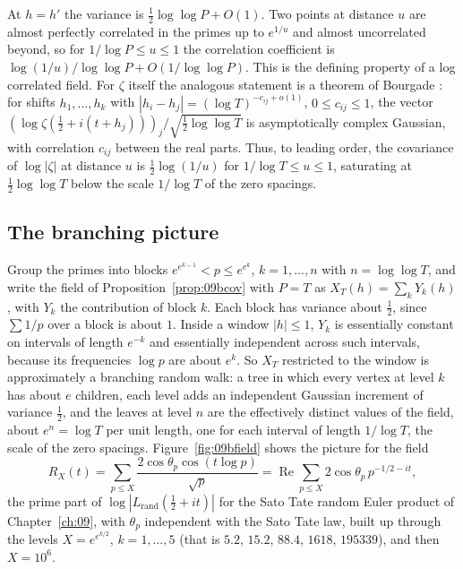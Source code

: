 At $h=h'$ the variance is $\frac12\log\log P+O(1)$. Two points at distance $u$ are almost perfectly correlated in the primes up to $e^{1/u}$ and almost uncorrelated beyond, so for $1/\log P\le u\le1$ the correlation coefficient is $\log(1/u)/\log\log P+O(1/\log\log P)$. This is the defining property of a log correlated field. For $\zeta$ itself the analogous statement is a theorem of Bourgade \cite{bourgade2010}: for shifts $h_1,\dots,h_k$ with $|h_i-h_j|=(\log T)^{-c_{ij}+o(1)}$, $0\le c_{ij}\le1$, the vector $(\log\zeta(\frac12+i(t+h_j)))_j/\sqrt{\frac12\log\log T}$ is asymptotically complex Gaussian, with correlation $c_{ij}$ between the real parts. Thus, to leading order, the covariance of $\log|\zeta|$ at distance $u$ is $\frac12\log(1/u)$ for $1/\log T\le u\le1$, saturating at $\frac12\log\log T$ below the scale $1/\log T$ of the zero spacings.

\subsection{The branching picture}

Group the primes into blocks $e^{e^{k-1}}<p\le e^{e^k}$, $k=1,\dots,n$ with $n=\log\log T$, and write the field of Proposition~\ref{prop:09bcov} with $P=T$ as $X_T(h)=\sum_kY_k(h)$, with $Y_k$ the contribution of block $k$. Each block has variance about $\frac12$, since $\sum1/p$ over a block is about $1$. Inside a window $|h|\le1$, $Y_k$ is essentially constant on intervals of length $e^{-k}$ and essentially independent across such intervals, because its frequencies $\log p$ are about $e^k$. So $X_T$ restricted to the window is approximately a branching random walk: a tree in which every vertex at level $k$ has about $e$ children, each level adds an independent Gaussian increment of variance $\frac12$, and the leaves at level $n$ are the effectively distinct values of the field, about $e^n=\log T$ per unit length, one for each interval of length $1/\log T$, the scale of the zero spacings. Figure~\ref{fig:09bfield} shows the picture for the field
\[
R_X(t)=\sum_{p\le X}\frac{2\cos\theta_p\cos(t\log p)}{\sqrt p}=\operatorname{Re}\sum_{p\le X}2\cos\theta_p\,p^{-1/2-it},
\]
the prime part of $\log|L_{\mathrm{rand}}(\frac12+it)|$ for the Sato Tate random Euler product of Chapter~\ref{ch:09}, with $\theta_p$ independent with the Sato Tate law, built up through the levels $X=e^{e^{k/2}}$, $k=1,\dots,5$ (that is $5.2$, $15.2$, $88.4$, $1618$, $195339$), and then $X=10^6$.

